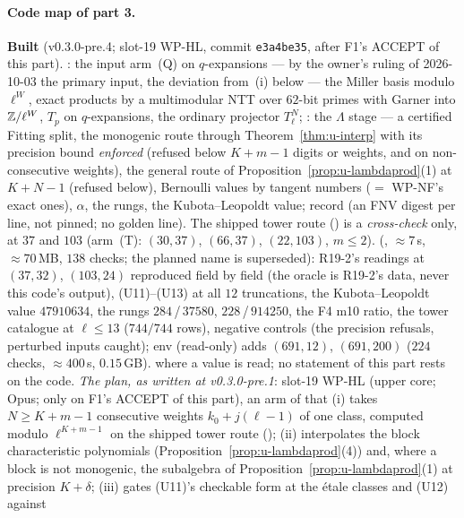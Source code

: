 \documentclass[11pt]{article}
\newcommand{\Iw}{\Lambda}                         %
\begin{document}
\paragraph{Code map of part 3.} \textbf{Built} (v0.3.0-pre.4; slot-19 WP-HL, commit \texttt{e3a4be35}, after F1's ACCEPT of this part). :
the input arm~(Q) on $q$-expansions --- by the owner's ruling of 2026-10-03 the primary input, the deviation from~(i) below --- the Miller basis modulo $\ell^{W}$, exact products by a
multimodular NTT over $62$-bit primes with Garner into $\mathbb{Z}/\ell^{W}$, $T_p$ on $q$-expansions, the ordinary projector $T_\ell^{N}$; : the $\Iw$ stage
--- a certified Fitting split, the monogenic route through Theorem~\ref{thm:u-interp} with its precision bound \emph{enforced} (refused below $K+m-1$ digits or weights, and on
non-consecutive weights), the general route of Proposition~\ref{prop:u-lambdaprod}(1) at $K+N-1$ (refused below), Bernoulli values by tangent numbers ($=$ WP-NF's exact ones), $\alpha$,
the rungs, the Kubota--Leopoldt value; record  (an FNV digest per line, not pinned; no golden line). The shipped tower route
() is a \emph{cross-check} only, at $37$ and $103$ (arm~(T): $(30,37)$, $(66,37)$, $(22,103)$, $m\le2$).  (,
$\approx7$\,s, $\approx70$\,MB, $138$ checks; the planned name  is superseded): R19-2's readings at $(37,32)$, $(103,24)$ reproduced field by field
(the oracle is R19-2's data, never this code's output), (U11)--(U13) at all $12$ truncations, the Kubota--Leopoldt value $47910634$, the rungs $284$\,/\,$37580$, $228$\,/\,$914250$, the
F4 m10 ratio, the tower catalogue at $\ell\le13$ ($744/744$ rows), negative controls (the precision refusals, perturbed inputs caught); env  (read-only)
adds $(691,12)$, $(691,200)$ ($224$ checks, $\approx400$\,s, $0.15$\,GB). \COMP{} where a value is read; no statement of this part rests on the code. \emph{The plan, as written at
v0.3.0-pre.1}: slot-19 WP-HL (upper core; Opus; only on F1's ACCEPT of this part), an
arm of  that (i) takes $N\ge K+m-1$ consecutive weights $k_0+j(\ell-1)$ of one class, computed modulo $\ell^{K+m-1}$ on the shipped
tower route (); (ii) interpolates the block characteristic polynomials (Proposition~\ref{prop:u-lambdaprod}(4)) and, where a block is not
monogenic, the subalgebra of Proposition~\ref{prop:u-lambdaprod}(1) at precision $K+\delta$; (iii) gates (U11)'s checkable form at the étale classes and (U12) against
\end{document}
